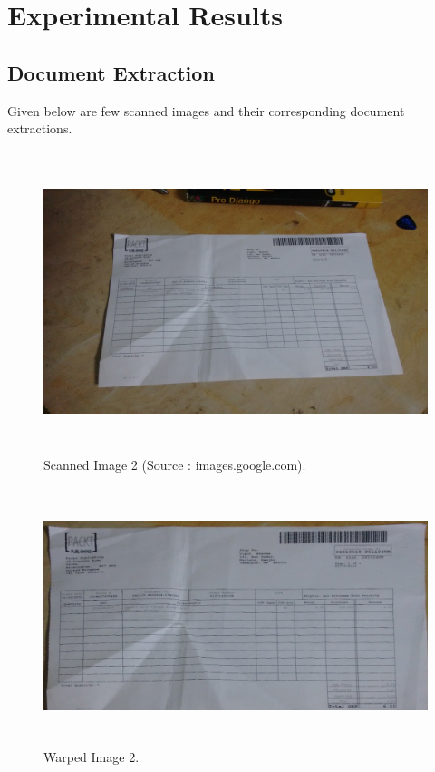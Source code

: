
\chapter{Experimental Results} %

\label{AppendixA} %

\section{Document Extraction}

Given below are few scanned images and their corresponding document extractions.

\begin{figure}[th]
	\centering
	\includegraphics[height=8.8cm ]{Figures/scanned_image2}
	\caption[Scanned Image 2]{Scanned Image 2 (Source : images.google.com).}
	\label{fig:ScannedImage2}
\end{figure}

\begin{figure}[th]
	\centering
	\includegraphics[height=7.5cm ]{Figures/warped_image2}
	\caption[Warped Image 2]{Warped Image 2.}
	\label{fig:WarpedImage2}
\end{figure}

